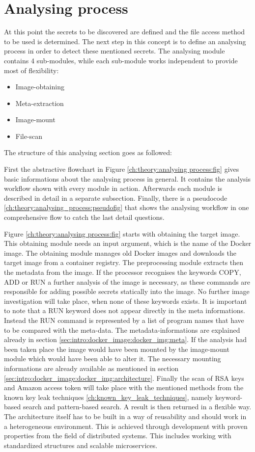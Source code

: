 \section{Analysing process}
\label{ch:theory:analysing_process}
At this point the secrets to be discovered are defined and the file access method to be used is determined. The next step in this concept is to define an analysing process in order to detect these mentioned secrets.
The analysing module contains 4 sub-modules, while each sub-module works independent to provide most of flexibility:
\begin{itemize}
\item Image-obtaining
\item Meta-extraction
\item Image-mount
\item File-scan
\end{itemize}

The structure of this analysing section goes as followed: 

First the abstractive flowchart in Figure \ref{ch:theory:analysing process:fig} gives basic informations about the analysing process in general. It contains the analysis workflow shown with every module in action. Afterwards each module is described in detail in a separate subsection.
Finally, there is a pseudocode \ref{ch:theory:analysing_process:pseudofig} that shows the analysing workflow in one comprehensive flow to catch the last detail questions.

Figure \ref{ch:theory:analysing process:fig} starts with obtaining the target image. This obtaining module needs an input argument, which is the name of the Docker image.
The obtaining module manages old Docker images and downloads the target image from a container registry. The preprocessing module extracts then the metadata from the image. If the processor recognises the keywords COPY, ADD or RUN a further analysis of the image is necessary, as these commands are responsible for adding possible secrets statically into the image. No further image investigation will take place, when none of these keywords exists. It is important to note that a RUN keyword does not appear directly in the meta informations. Instead the RUN command is represented by a list of program names that have to be compared with the meta-data. The metadata-informations are explained already in section \ref{sec:intro:docker_image:docker_img:meta}. If the analysis had been taken place the image would have been mounted by the image-mount module which would have been able to alter it. The necessary mounting informations are already available as mentioned in section \ref{sec:intro:docker_image:docker_img:architecture}. Finally the scan of RSA keys and Amazon access token will take place with the mentioned methods from the known key leak techniques \ref{ch:known_key_leak_techniques}, namely keyword-based search and pattern-based search. A result is then returned in a flexible way.
The architecture itself has to be built in a way of reusability and should work in a heterogeneous environment. This is achieved through development with proven properties from the field of distributed systems. This includes working with standardized structures and scalable microservices.

